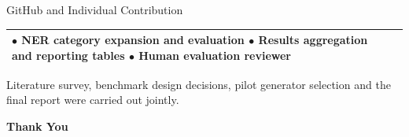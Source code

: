 \documentclass[aspectratio=169,11pt]{beamer}
\begin{document}
\begin{frame}{GitHub and Individual Contribution}
{\begin{center}
\begin{tabular}{@{}p{34mm}p{34mm}p{34mm}@{}}
{\scriptsize $\bullet$ NER category expansion and evaluation}\newline
{\scriptsize $\bullet$ Results aggregation and reporting tables}\newline
{\scriptsize $\bullet$ Human evaluation reviewer}\\
\bottomrule
\end{tabular}
\end{center}
\vspace{4mm}
\begin{center}{\color{soft}\scriptsize Literature survey, benchmark design decisions, pilot generator selection and the final report were carried out jointly.}\end{center}
}
\end{frame}

{
\begin{frame}[plain]
\vspace{22mm}
\begin{center}
{\Huge\bfseries\color{iutblue} Thank You}
\end{center}
\end{frame}}
\end{document}
